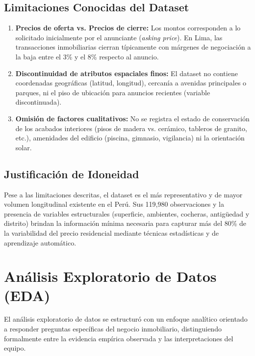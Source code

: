 \documentclass[11pt,a4paper]{article}
\begin{document}
\subsection{Limitaciones Conocidas del Dataset}
\begin{enumerate}[leftmargin=1.5cm]
    \item \textbf{Precios de oferta vs. Precios de cierre:} Los montos corresponden a lo solicitado inicialmente por el anunciante (\textit{asking price}). En Lima, las transacciones inmobiliarias cierran típicamente con márgenes de negociación a la baja entre el 3\% y el 8\% respecto al anuncio.
    \item \textbf{Discontinuidad de atributos espaciales finos:} El dataset no contiene coordenadas geográficas (latitud, longitud), cercanía a avenidas principales o parques, ni el piso de ubicación para anuncios recientes (variable discontinuada).
    \item \textbf{Omisión de factores cualitativos:} No se registra el estado de conservación de los acabados interiores (pisos de madera vs. cerámico, tableros de granito, etc.), amenidades del edificio (piscina, gimnasio, vigilancia) ni la orientación solar.
\end{enumerate}

\subsection{Justificación de Idoneidad}
Pese a las limitaciones descritas, el dataset es el más representativo y de mayor volumen longitudinal existente en el Perú. Sus 119,980 observaciones y la presencia de variables estructurales (superficie, ambientes, cocheras, antigüedad y distrito) brindan la información mínima necesaria para capturar más del 80\% de la variabilidad del precio residencial mediante técnicas estadísticas y de aprendizaje automático.

\section{Análisis Exploratorio de Datos (EDA)}

El análisis exploratorio de datos se estructuró con un enfoque analítico orientado a responder preguntas específicas del negocio inmobiliario, distinguiendo formalmente entre la evidencia empírica observada y las interpretaciones del equipo.
\end{document}
